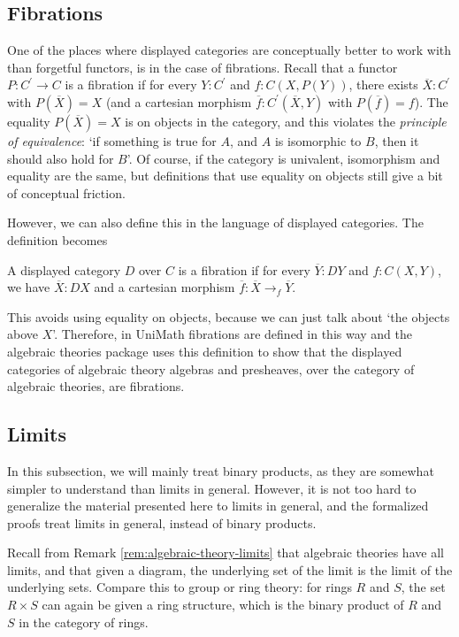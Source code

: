 \subsection{Fibrations}\label{subsec:fibrations}

One of the places where displayed categories are conceptually better to work with than forgetful functors, is in the case of fibrations. Recall that a functor $ P: C^\prime \to C $ is a fibration if for every $ Y : C^\prime $ and $ f : C(X, P(Y)) $, there exists $ \overline X : C^\prime $ with $ P(\overline X) = X $ (and a cartesian morphism $ \overline f : C^\prime(\overline X, Y) $ with $ P(\overline f) = f $). The equality $ P(\overline X) = X $ is on objects in the category, and this violates the \textit{principle of equivalence}: `if something is true for $ A $, and $ A $ is isomorphic to $ B $, then it should also hold for $ B $'. Of course, if the category is univalent, isomorphism and equality are the same, but definitions that use equality on objects still give a bit of conceptual friction.

However, we can also define this in the language of displayed categories. The definition becomes
\begin{definition}
  A displayed category $ D $ over $ C $ is a fibration if for every $ \overline Y : D Y $ and $ f: C(X, Y) $, we have $ \overline X : D X $ and a cartesian morphism $ \overline f : \overline X \to_f \overline Y $.
\end{definition}
This avoids using equality on objects, because we can just talk about `the objects above $ X $'. Therefore, in UniMath fibrations are defined in this way and the algebraic theories package uses this definition to show that the displayed categories of algebraic theory algebras and presheaves, over the category of algebraic theories, are fibrations.

\subsection{Limits}
In this subsection, we will mainly treat binary products, as they are somewhat simpler to understand than limits in general. However, it is not too hard to generalize the material presented here to limits in general, and the formalized proofs treat limits in general, instead of binary products.

Recall from Remark \ref{rem:algebraic-theory-limits} that algebraic theories have all limits, and that given a diagram, the underlying set of the limit is the limit of the underlying sets. Compare this to group or ring theory: for rings $ R $ and $ S $, the set $ R \times S $ can again be given a ring structure, which is the binary product of $ R $ and $ S $ in the category of rings.

